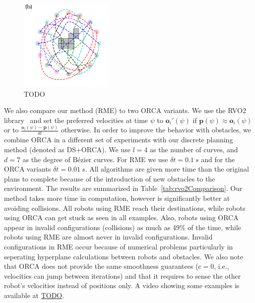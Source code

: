\documentclass{svproc}
\newcommand{\vp}{\mathbf{p}}
\newcommand{\vo}{\mathbf{o}}
\begin{document}
\begin{figure}
\hfill
\includegraphics[width=0.40\textwidth]{images/ex_19.pdf}
\caption{
TODO
}
\label{fig:swap2_2}
\end{figure}

We also compare our method (RME) to two ORCA variants.
We use the RVO2 library~\cite{orca} and set the preferred velocities at time $\psi$ to $\vo_i'(\psi)$ if $\vp(\psi)\approx \vo_i(\psi)$ or to $\frac{\vo_i(\psi) - \vp(\psi)}{\delta t}$ otherwise.
In order to improve the behavior with obstacles, we combine ORCA in a different set of experiments with our discrete planning method (denoted as DS+ORCA).
We use $l=4$ as the number of curves, and $d=7$ as the degree of B\'ezier curves.
For RME we use $\delta t = \SI{0.1}{s}$ and for the ORCA variants $\delta t = \SI{0.01}{s}$.
All algorithms are given more time than the original plans to complete because of the introduction of new obstacles to the environment.
The results are summarized in Table~\ref{tab:rvo2Comparison}.
Our method takes more time in computation, however is significantly better at avoiding collisions.
All robots using RME reach their destinations, while robots using ORCA can get stuck as seen in all examples.
Also, robots using ORCA appear in invalid configurations (collisions) as much as 49\% of the time, while robots using RME are almost never in invalid configurations.
Invalid configurations in RME occur because of numerical problems particularly in seperating hyperplane calculations between robots and obstacles.
We also note that ORCA does not provide the same smoothness guarantees ($c=0$, i.e., velocities can jump between iterations) and that it requires to sense the other robot's velocities instead of positions only.
A video showing some examples is available at \url{TODO}.
\end{document}
